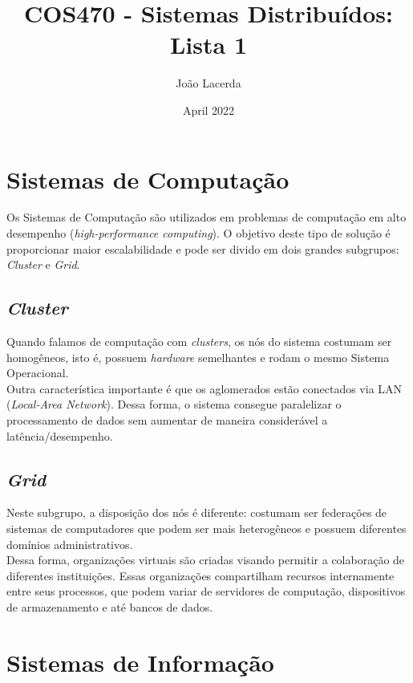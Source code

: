 \documentclass{article}
\title{COS470 - Sistemas Distribuídos: \\
  \large Lista 1}
\author{João Lacerda\\ \email{jpedrodelacerda@poli.ufrj.br}}
\date{April 2022}
\begin{document}
\maketitle

\section{Sistemas de Computação}

Os Sistemas de Computação são utilizados em problemas de computação em alto desempenho (\textit{high-performance computing}).
O objetivo deste tipo de solução é proporcionar maior escalabilidade e pode ser divido em dois grandes subgrupos: \textit{Cluster} e \textit{Grid}.

\subsection{\textit{Cluster}}

Quando falamos de computação com \textit{clusters}, os nós do sistema costumam ser homogêneos, isto é, possuem \textit{hardware} semelhantes e rodam o mesmo Sistema Operacional.\\
Outra característica importante é que os aglomerados estão conectados via LAN (\textit{Local-Area Network}). Dessa forma, o sistema consegue paralelizar o processamento de dados sem aumentar de maneira considerável a latência/desempenho.

\subsection{\textit{Grid}}

Neste subgrupo, a disposição dos nós é diferente: costumam ser federações de sistemas de computadores que podem ser mais heterogêneos e possuem diferentes domínios administrativos.\\
Dessa forma, organizações virtuais são criadas visando permitir a colaboração de diferentes instituições. Essas organizações compartilham recursos internamente entre seus processos, que podem variar de servidores de computação, dispositivos de armazenamento e até bancos de dados.


\section{Sistemas de Informação}
\end{document}

